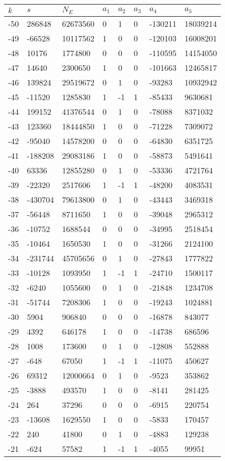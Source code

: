 \documentclass{amsart}
\begin{document}
\begin{longtable}{|l|l|l|lllll|}
\hline
$k$ & $s$ & $N_E$ & $a_1$ & $a_2$ & $a_3$ & $a_4$ & $a_5$\\
\hline
-50&286848&62673560&0&1&0&-130211&18039214\\
-49&-66528&10117562&1&0&0&-120103&16008201\\
-48&10176&1774800&0&0&0&-110595&14154050\\
-47&14640&2300650&1&0&0&-101663&12465817\\
-46&139824&29519672&0&1&0&-93283&10932942\\
-45&-11520&1285830&1&-1&1&-85433&9630681\\
-44&199152&41376544&0&1&0&-78088&8371032\\
-43&123360&18444850&1&0&0&-71228&7309072\\
-42&-95040&14578200&0&0&0&-64830&6351725\\
-41&-188208&29083186&1&0&0&-58873&5491641\\
-40&63336&12855280&0&1&0&-53336&4721764\\
-39&-22320&2517606&1&-1&1&-48200&4083531\\
-38&-430704&79613800&0&1&0&-43443&3469318\\
-37&-56448&8711650&1&0&0&-39048&2965312\\
-36&-10752&1688544&0&0&0&-34995&2518454\\
-35&-10464&1650530&1&0&0&-31266&2124100\\
-34&-231744&45705656&0&1&0&-27843&1777822\\
-33&-10128&1093950&1&-1&1&-24710&1500117\\
-32&-6240&1055600&0&1&0&-21848&1234708\\
-31&-51744&7208306&1&0&0&-19243&1024881\\
-30&5904&906840&0&0&0&-16878&843077\\
-29&4392&646178&1&0&0&-14738&686596\\
-28&1008&173600&0&1&0&-12808&552888\\
-27&-648&67050&1&-1&1&-11075&450627\\
-26&69312&12000664&0&1&0&-9523&353862\\
-25&-3888&493570&1&0&0&-8141&281425\\
-24&264&37296&0&0&0&-6915&220754\\
-23&-13608&1629550&1&0&0&-5833&170457\\
-22&240&41800&0&1&0&-4883&129238\\
-21&-624&57582&1&-1&1&-4055&99951\\

\end{longtable}
\end{document}
